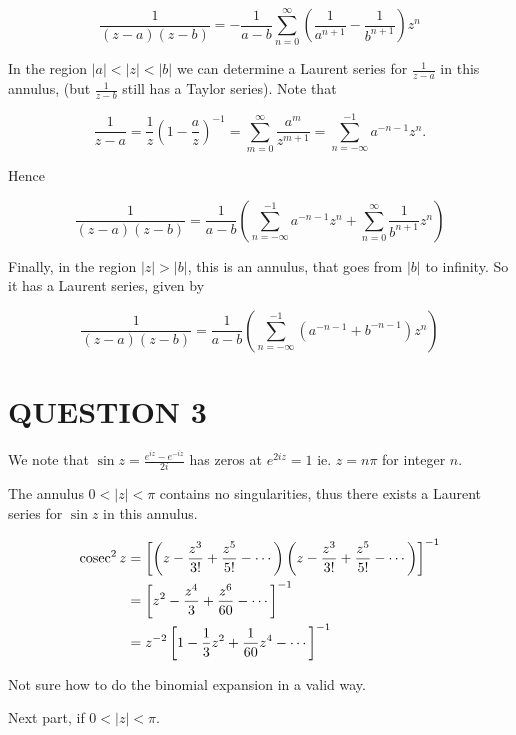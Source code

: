\documentclass[a4paper]{article}
\begin{document}
\[ \frac{1}{(z-a)(z-b)} = -\frac{1}{a-b} \sum_{n=0}^{\infty} \left(  \frac{1}{a^{n+1}} - \frac{1}{b^{n+1}} \right)  z^{n}   \]




In the region $ | a | < | z | < | b | $ we can determine a Laurent series for $ \frac{1}{z-a} $ in this annulus, (but $ \frac{1}{z-b} $ still has a Taylor series). Note that 

\[
\frac{1}{z - a} = \frac{1}{z} \left(1 - \frac{a}{z}\right)^{-1} = \sum_{m = 0}^\infty \frac{a^m}{z^{m + 1}} = \sum_{n = -\infty}^{-1} a^{-n - 1} z^n.
\]


Hence

\[ \frac{1}{(z-a)(z-b)} = \frac{1}{a-b} \left(  \sum_{n = -\infty}^{-1} a^{-n - 1} z^n + \sum_{n=0}^{\infty} \frac{1}{b^{n+1}} z^{n}   \right)   \]



Finally, in the region $ | z | > | b | $, this is an annulus, that goes from $|b|$ to infinity. So it has a Laurent series, given by



\[ \frac{1}{(z-a)(z-b)} = \frac{1}{a-b} \left(  \sum_{n = -\infty}^{-1} (a^{-n - 1}  + b^{-n-1})z^n  \right)   \]




\section{QUESTION 3}


We note that $ \sin z = \frac{e^{iz} - e^{-iz}}{2i} $ has zeros at $ e^{2iz} = 1 $ ie. $ z = n \pi $ for integer $ n $. 

The annulus $ 0 < | z | < \pi $ contains no singularities, thus there exists a Laurent series for $ \sin z $ in this annulus. 

\begin{align*}
\operatorname{cosec}^{2} z& = \left[     \left( z - \frac{z^{3}}{3!} + \frac{z^{5}}{5!} - \cdots \right)\left( z - \frac{z^{3}}{3!} + \frac{z^{5}}{5!} - \cdots \right)  \right]^{-1}  \\
& = \left[   z^{2} - \frac{z^{4}}{3} + \frac{z^{6}}{60} - \cdots \right]^{-1} \\
& = z^{-2} \left[   1 - \frac{1}{3} z^{2} + \frac{1}{60} z^{4} - \cdots \right]^{-1}
\end{align*}

Not sure how to do the binomial expansion in a valid way.

Next part, if $ 0 < | z | < \pi $. 
\end{document}
